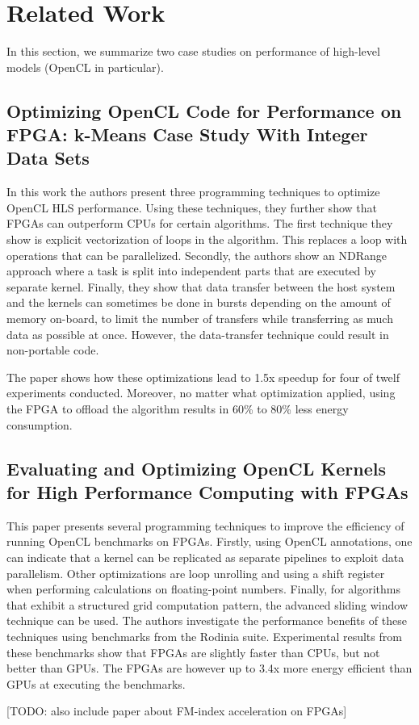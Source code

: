 \section{Related Work} \label{section:related_work}

In this section, we summarize two case studies on performance of high-level models (OpenCL in particular).

\subsection*{Optimizing OpenCL Code for Performance on FPGA: k-Means Case Study With Integer Data Sets \cite{zohouri_evaluating_2016}}

In this work the authors present three programming techniques to optimize OpenCL HLS performance.
Using these techniques, they further show that FPGAs can outperform CPUs for certain algorithms.
The first technique they show is explicit vectorization of loops in the algorithm.
This replaces a loop with operations that can be parallelized.
Secondly, the authors show an NDRange approach where a task is split into independent parts that are executed by separate kernel.
Finally, they show that data transfer between the host system and the kernels can sometimes be done in bursts depending on the amount of memory on-board, to limit the number of transfers while transferring as much data as possible at once.
However, the data-transfer technique could result in non-portable code.

The paper shows how these optimizations lead to 1.5x speedup for four of twelf experiments conducted.
Moreover, no matter what optimization applied, using the FPGA to offload the algorithm results in 60\% to 80\% less energy consumption.

\subsection*{Evaluating and Optimizing OpenCL Kernels for High Performance Computing with FPGAs \cite{paulino_optimizing_2020}}

This paper presents several programming techniques to improve the efficiency of running OpenCL benchmarks on FPGAs.
Firstly, using OpenCL annotations, one can indicate that a kernel can be replicated as separate pipelines to exploit data parallelism.
Other optimizations are loop unrolling and using a shift register when performing calculations on floating-point numbers.
Finally, for algorithms that exhibit a structured grid computation pattern, the advanced sliding window technique can be used.
The authors investigate the performance benefits of these techniques using benchmarks from the Rodinia suite.
Experimental results from these benchmarks show that FPGAs are slightly faster than CPUs, but not better than GPUs.
The FPGAs are however up to 3.4x more energy efficient than GPUs at executing the benchmarks.

[TODO: also include paper about FM-index acceleration on FPGAs]
